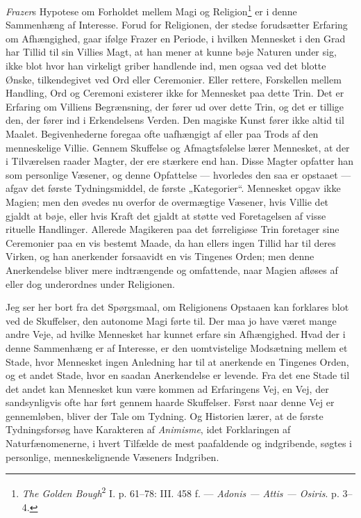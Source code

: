 \documentclass[12pt,a4paper]{book}
\newcommand{\apage}[1]{\marginnote{\footnotesize\textit{[#1]}}}
\begin{document}
\emph{Frazer}s Hypotese om Forholdet mellem Magi og
Religion\footnote{\emph{The Golden Bough}\textsuperscript{2} I. p. 61--78: III. 458 f. --- \emph{Adonis --- Attis --- Osiris}. p. 3--4.} er
i denne Sammenhæng af Interesse. Forud for Religionen, der stedse
forudsætter Erfaring om Afhængighed, gaar ifølge Frazer en Periode, i
hvilken Mennesket i den Grad har Tillid til sin Villies Magt, at han
mener at kunne bøje Naturen under sig, ikke blot hvor han virkeligt
griber handlende ind, men ogsaa ved det blotte Ønske, tilkendegivet \apage{114} ved
Ord eller Ceremonier. Eller rettere, Forskellen mellem Handling, Ord og
Ceremoni existerer ikke for Mennesket paa dette Trin. Det er Erfaring om
Villiens Begrænsning, der fører ud over dette Trin, og det er tillige
den, der fører ind i Erkendelsens Verden. Den magiske Kunst fører ikke
altid til Maalet. Begivenhederne foregaa ofte uafhængigt af eller paa
Trods af den menneskelige Villie. Gennem Skuffelse og Afmagtsfølelse
lærer Mennesket, at der i Tilværelsen raader Magter, der ere stærkere
end han. Disse Magter opfatter han som personlige Væsener, og denne
Opfattelse --- hvorledes den saa er opstaaet --- afgav det første
Tydningsmiddel, de første „Kategorier“. Mennesket opgav ikke Magien; men
den øvedes nu overfor de overmægtige Væsener, hvis Villie det gjaldt at
bøje, eller hvis Kraft det gjaldt at støtte ved Foretagelsen af visse
rituelle Handlinger. Allerede Magikeren paa det førreligiøse Trin
foretager sine Ceremonier paa en vis bestemt Maade, da han ellers ingen
Tillid har til deres Virken, og han anerkender forsaavidt en vis
Tingenes Orden; men denne Anerkendelse bliver mere indtrængende og
omfattende, naar Magien afløses af eller dog underordnes under
Religionen.

Jeg ser her bort fra det Spørgsmaal, om Religionens Opstaaen kan
forklares blot ved de Skuffelser, den autonome Magi førte til. Der maa
jo have været mange andre Veje, ad hvilke Mennesket har kunnet erfare
sin Afhængighed. Hvad der i denne Sammenhæng er af Interesse, er den
uomtvistelige Modsætning mellem et Stade, hvor Mennesket ingen Anledning
har til at anerkende en Tingenes Orden, og et andet Stade, hvor en
saadan Anerkendelse er levende. Fra det ene Stade til det andet kan
Mennesket kun være kommen ad Erfaringens Vej, en Vej, der sandsynligvis
ofte har ført gennem haarde Skuffelser. Først naar denne Vej er
gennemløben, bliver der Tale om Tydning. Og Historien lærer, at de
første Tydningsforsøg have Karakteren af \emph{Animisme}, idet
Forklaringen af Naturfænomenerne, i hvert Tilfælde de mest paafaldende
og indgribende, søgtes i personlige, menneskelignende Væseners
Indgriben.
\end{document}
